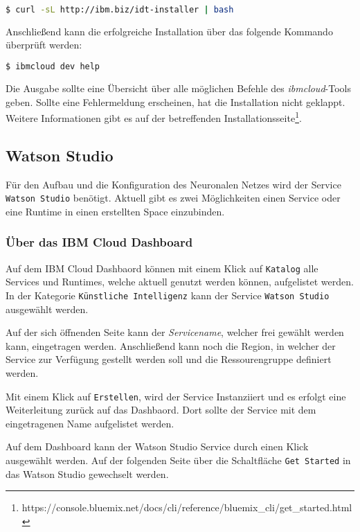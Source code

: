 \begin{lstlisting}[language=bash, caption=Installation des IBM Cloud CLI, label=Installation des IBM Cloud CLI]
    $ curl -sL http://ibm.biz/idt-installer | bash
\end{lstlisting}

Anschließend kann die erfolgreiche Installation über das folgende Kommando überprüft werden:

\begin{lstlisting}[language=bash, caption=Installation des CLI überprüfen, label=Installation des CLI überprüfen]
    $ ibmcloud dev help
\end{lstlisting}

Die Ausgabe sollte eine Übersicht über alle möglichen Befehle des \textit{ibmcloud}-Tools geben. Sollte eine Fehlermeldung
erscheinen, hat die Installation nicht geklappt. Weitere Informationen gibt es auf der betreffenden
Installationsseite\footnote{https://console.bluemix.net/docs/cli/reference/bluemix\_cli/get\_started.html}.

\subsection{Watson Studio}
Für den Aufbau und die Konfiguration des Neuronalen Netzes wird der Service \texttt{Watson Studio} benötigt. Aktuell gibt
es zwei Möglichkeiten einen Service oder eine Runtime in einen erstellten Space einzubinden.

\subsubsection*{Über das IBM Cloud Dashboard}
Auf dem IBM Cloud Dashbaord können mit einem Klick auf \texttt{Katalog} alle Services und Runtimes, welche aktuell genutzt
werden können, aufgelistet werden. In der Kategorie \texttt{Künstliche Intelligenz} kann der Service \texttt{Watson Studio}
ausgewählt werden.

Auf der sich öffnenden Seite kann der \textit{Servicename}, welcher frei gewählt werden kann, eingetragen werden.
Anschließend kann noch die Region, in welcher der Service zur Verfügung gestellt werden soll und die Ressourengruppe
definiert werden.

Mit einem Klick auf \texttt{Erstellen}, wird der Service Instanziiert und es erfolgt eine Weiterleitung zurück auf das
Dashbaord. Dort sollte der Service mit dem eingetragenen Name aufgelistet werden.

Auf dem Dashboard kann der Watson Studio Service durch einen Klick ausgewählt werden. Auf der folgenden Seite über die
Schaltfläche \texttt{Get Started} in das Watson Studio gewechselt werden.

